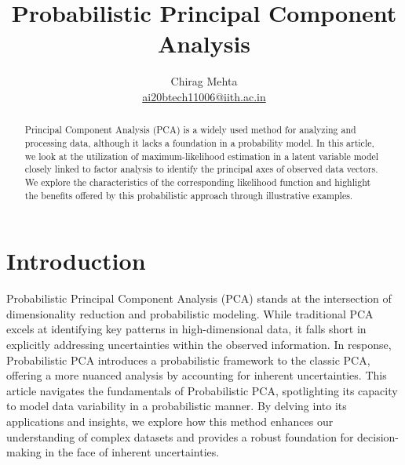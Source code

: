 \documentclass[10pt,onecolumn,letterpaper]{article}
\title{Probabilistic Principal Component Analysis}
\author{Chirag Mehta \\ \href{mailto:ai20btech11006@iith.ac.in}{ai20btech11006@iith.ac.in}}
\begin{document}
\maketitle

\begin{abstract}
    Principal Component Analysis (PCA) is a widely used method for analyzing and processing data, although it lacks a foundation in a probability model. In this article, we look at the utilization of maximum-likelihood estimation in a latent variable model closely linked to factor analysis to identify the principal axes of observed data vectors. We explore the characteristics of the corresponding likelihood function and highlight the benefits offered by this probabilistic approach through illustrative examples.
\end{abstract}

\section{Introduction}

Probabilistic Principal Component Analysis (PCA) stands at the intersection of dimensionality reduction and probabilistic modeling. While traditional PCA excels at identifying key patterns in high-dimensional data, it falls short in explicitly addressing uncertainties within the observed information. In response, Probabilistic PCA introduces a probabilistic framework to the classic PCA, offering a more nuanced analysis by accounting for inherent uncertainties. This article navigates the fundamentals of Probabilistic PCA, spotlighting its capacity to model data variability in a probabilistic manner. By delving into its applications and insights, we explore how this method enhances our understanding of complex datasets and provides a robust foundation for decision-making in the face of inherent uncertainties.
\end{document}
